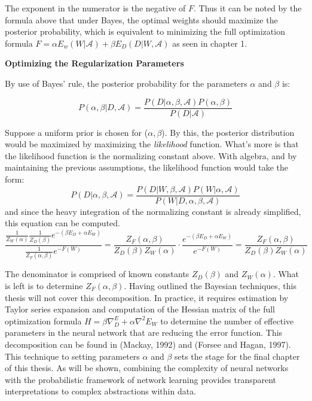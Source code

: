 The exponent in the numerator is the negative of $F$.  Thus it can be noted by the formula above that under Bayes, the optimal weights should maximize the posterior probability, which is equivalent to minimizing the full optimization formula $F = \alpha E_w(W|\mathcal{A}) + \beta E_D(D|W,\mathcal{A})$ as seen in chapter 1.


\textbf{Optimizing the Regularization Parameters}

By use of Bayes' rule, the posterior probability for the parameters $\alpha$ and $\beta$ is:

$$
P(\alpha, \beta | D,\mathcal{A}) = \frac{P(D|\alpha,\beta,\mathcal{A}) P(\alpha,\beta)}{P(D|\mathcal{A})}
$$



Suppose a uniform prior is chosen for ($\alpha,\beta$).  By this, the posterior distribution would be maximized by maximizing the \textit{likelihood} function.  What's more is that the likelihood function is the normalizing constant above.  With algebra, and by maintaining the previous assumptions, the likelihood function would take the form:
$$
P(D|\alpha,\beta,\mathcal{A}) = \frac{P(D|W,\beta,\mathcal{A}) P(W|\alpha,\mathcal{A})}{P(W|D,\alpha,\beta,\mathcal{A})}
$$
and since the heavy integration of the normalizing constant is already simplified, this equation can be computed.
$$
\frac{\frac{1}{Z_W(\alpha)} \frac{1}{Z_D(\beta)} e^{-(\beta E_D + \alpha E_W)}}{\frac{1}{Z_F(\alpha,\beta)} e^{-F(W)}} = \frac{Z_F(\alpha,\beta)}{Z_D(\beta) Z_W(\alpha)} \cdot \frac{e^{-(\beta E_D + \alpha E_W)}}{e^{-F(W)}} = \frac{Z_F(\alpha,\beta)}{Z_D(\beta) Z_W(\alpha)}
$$

The denominator is comprised of known constants $Z_D(\beta)$ and $Z_W(\alpha)$.  What is left is to determine $Z_F(\alpha,\beta)$.  Having outlined the Bayesian techniques, this thesis will not cover this decomposition.  In practice, it requires estimation by Taylor series expansion and computation of the Hessian matrix of the full optimization formula $H = \beta \nabla^ E_D + \alpha \nabla^2 E_W$ to determine the number of effective parameters in the neural network that are reducing the error function.  This decomposition can be found in (Mackay, 1992) and (Forsee and Hagan, 1997).  This technique to setting parameters $\alpha$ and $\beta$ sets the stage for the final chapter of this thesis. As will be shown, combining the complexity of neural networks with the probabilistic framework of network learning provides transparent interpretations to complex abstractions within data.


\begin{comment}
Through \textbf{margialization}, the true posterior $P(w|D,A)$ is obtained by integrating out $\alpha$ and $\beta$:
$$
P(w|D,A) = \int P(w|D,\alpha,\beta,A) P(\alpha, \beta | D,A) \text{ } d\alpha \text{ } d\beta
$$
\end{comment}
